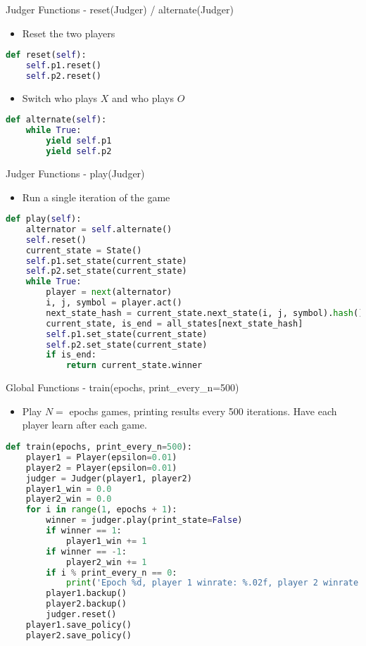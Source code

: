 \documentclass{beamer}
\begin{document}
\begin{frame}[fragile]{Judger Functions - reset(Judger) / alternate(Judger)}
\begin{itemize}
	\item Reset the two players
\end{itemize}
\begin{lstlisting}[language=Python]
def reset(self):
    self.p1.reset()
    self.p2.reset()
\end{lstlisting}
\begin{itemize}
	\item Switch who plays $X$ and who plays $O$
\end{itemize}
\begin{lstlisting}[language=Python]
def alternate(self):
    while True:
        yield self.p1
        yield self.p2
\end{lstlisting}
\end{frame}
\begin{frame}[fragile]{Judger Functions - play(Judger)}
\begin{itemize}
	\item Run a single iteration of the game
\end{itemize}
\begin{lstlisting}[language=Python]
def play(self):
    alternator = self.alternate()
    self.reset()
    current_state = State()
    self.p1.set_state(current_state)
    self.p2.set_state(current_state)
    while True:
        player = next(alternator)
        i, j, symbol = player.act()
        next_state_hash = current_state.next_state(i, j, symbol).hash()
        current_state, is_end = all_states[next_state_hash]
        self.p1.set_state(current_state)
        self.p2.set_state(current_state)
        if is_end:
            return current_state.winner
\end{lstlisting}
\end{frame}
\begin{frame}[fragile]{Global Functions - train(epochs, print\_every\_n=500)}
	\begin{itemize}
		\item Play $N = $ epochs games, printing results every 500 iterations. Have each player learn after each game.
	\end{itemize}
\begin{lstlisting}[language=Python]
def train(epochs, print_every_n=500):
    player1 = Player(epsilon=0.01)
    player2 = Player(epsilon=0.01)
    judger = Judger(player1, player2)
    player1_win = 0.0
    player2_win = 0.0
    for i in range(1, epochs + 1):
        winner = judger.play(print_state=False)
        if winner == 1:
            player1_win += 1
        if winner == -1:
            player2_win += 1
        if i % print_every_n == 0:
            print('Epoch %d, player 1 winrate: %.02f, player 2 winrate: %.02f' % (i, player1_win / i, player2_win / i))
        player1.backup()
        player2.backup()
        judger.reset()
    player1.save_policy()
    player2.save_policy()
\end{lstlisting}
\end{frame}
\end{document}
